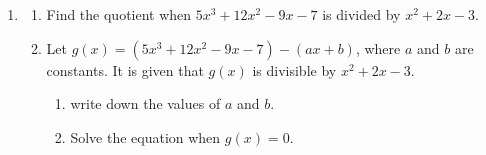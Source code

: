 \documentclass[11pt]{article}
\begin{document}
\begin{enumerate}
            \hrulefill
            
            \hrulefill
            
            \hrulefill
            
            \hrulefill
            
            \hrulefill
            
            \hrulefill
            
            \hrulefill

            \hrulefill
            
            \hrulefill
            
            \hrulefill
            
            \hrulefill

            \hrulefill
            
            \hrulefill
            
            \hrulefill
            
            \hrulefill
            
            \hrulefill
            
            \hrulefill
            
            \hrulefill
            
            \hrulefill
            
            \hrulefill
            
            \hrulefill

        \pagebreak
        \item \begin{enumerate}
            \item Find the quotient when $5x^3+12x^2-9x-7$ is divided by $x^2+2x-3$.
            \item Let $g(x)=(5x^3+12x^2-9x-7)-(ax+b)$, where $a$ and $b$ are constants. It is given that $g(x)$ is divisible by $x^2+2x-3$.\begin{enumerate}
                \item write down the values of $a$ and $b$.
                \item Solve the equation when $g(x)=0$.
            \end{enumerate}
        \end{enumerate}

        \hrulefill
                
            \hrulefill
            
            \hrulefill
            

\end{enumerate}
\end{document}
